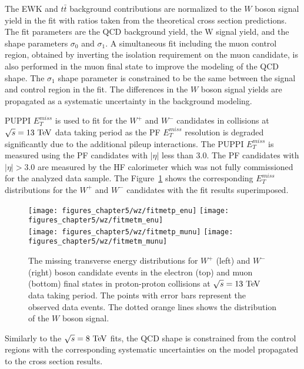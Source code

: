 The EWK and $t\bar{t}$ background contributions are normalized to the $W$ boson signal yield in the fit with ratios taken from the theoretical cross section predictions. The fit parameters are the QCD background yield, the W signal yield, and the shape parameters $\sigma_0$ and $\sigma_1$. A simultaneous fit including the muon control region, obtained by inverting the isolation requirement on the muon candidate, is also performed in the muon final state to improve the modeling of the QCD shape. The $\sigma_1$ shape parameter is constrained to be the same between the signal and control region in the fit. The differences in the $W$ boson signal yields are propagated as a systematic uncertainty in the background modeling.    
 
PUPPI $E_{T}^{miss}$ is used to fit for the $W^{+}$ and $W^{-}$ candidates in collisions at $\sqrt{s}=13~\mathrm{Te\kern -0.1em V}$ data taking period as the PF $E_{T}^{miss}$ resolution is degraded significantly due to the additional pileup interactions. The PUPPI $E_{T}^{miss}$ is measured using the PF candidates with $|\eta|$ less than $3.0$. The PF candidates with $|\eta|>3.0$ are measured by the HF calorimeter which was not fully commissioned for the analyzed data sample. The  Figure~\ref{fig:W13} shows the corresponding $E_{T}^{miss}$ distributions for the $W^{+}$ and $W^{-}$ candidates with the fit results superimposed.
\begin{figure}[h]
\centering
\texttt{[image: figures\_chapter5/wz/fitmetp\_enu]}
\texttt{[image: figures\_chapter5/wz/fitmetm\_enu]}\\
\texttt{[image: figures\_chapter5/wz/fitmetp\_munu]}
\texttt{[image: figures\_chapter5/wz/fitmetm\_munu]}
\caption{The missing transverse energy distributions for $W^+$  (left) and $W^-$  (right) boson candidate events in the electron (top) and muon (bottom) final states in proton-proton collisions at $\sqrt{s}=13~\mathrm{Te\kern -0.1em V}$ data taking period. The points with error bars represent the observed data events. The dotted orange lines shows the distribution of the $W$ boson signal. 
\label{fig:W13}}
\end{figure}
Similarly to the $\sqrt{s}=8~\mathrm{Te\kern -0.1em V}$ fits, the QCD shape is constrained from the control regions with the corresponding systematic uncertainties on the model propagated to the cross section results. 

